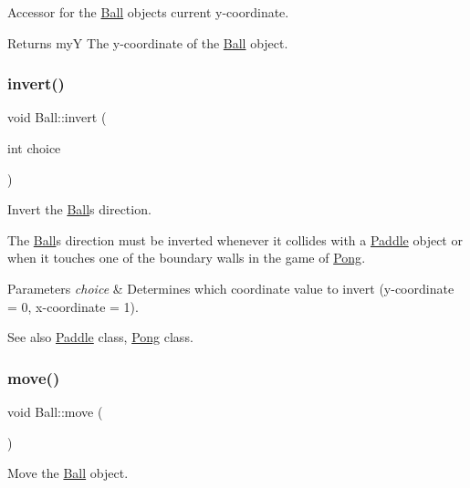 Accessor for the \hyperlink{class_ball}{Ball} object\textquotesingle{}s current y-\/coordinate. 

\begin{DoxyReturn}{Returns}
myY The y-\/coordinate of the \hyperlink{class_ball}{Ball} object. 
\end{DoxyReturn}
\mbox{\label{class_ball_a478963d27b3814529c53ed0818f8ea9d}} 
\subsubsection{\texorpdfstring{invert()}{invert()}}
{\footnotesize\ttfamily void Ball\+::invert (\begin{DoxyParamCaption}\item[{int}]{choice }\end{DoxyParamCaption})}



Invert the \hyperlink{class_ball}{Ball}\textquotesingle{}s direction. 

The \hyperlink{class_ball}{Ball}\textquotesingle{}s direction must be inverted whenever it collides with a \hyperlink{class_paddle}{Paddle} object or when it touches one of the boundary walls in the game of \hyperlink{class_pong}{Pong}. 
\begin{DoxyParams}{Parameters}
{\em choice} & Determines which coordinate value to invert (y-\/coordinate = 0, x-\/coordinate = 1). \\
\hline
\end{DoxyParams}
\begin{DoxySeeAlso}{See also}
\hyperlink{class_paddle}{Paddle} class, \hyperlink{class_pong}{Pong} class. 
\end{DoxySeeAlso}
\mbox{\label{class_ball_a05228e822d67b25baf715cf09c325494}} 
\subsubsection{\texorpdfstring{move()}{move()}}
{\footnotesize\ttfamily void Ball\+::move (\begin{DoxyParamCaption}{ }\end{DoxyParamCaption})}



Move the \hyperlink{class_ball}{Ball} object. 

